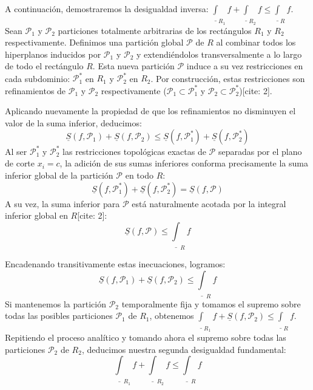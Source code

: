 \documentclass[11pt,letterpaper]{article}
\begin{document}
A continuación, demostraremos la desigualdad inversa: $\underline{\int}_{R_{1}}f + \underline{\int}_{R_{2}}f \le \underline{\int}_{R}f$.
Sean $\mathcal{P}_{1}$ y $\mathcal{P}_{2}$ particiones totalmente arbitrarias de los rectángulos $R_{1}$ y $R_{2}$ respectivamente. Definimos una partición global $\mathcal{P}$ de $R$ al combinar todos los hiperplanos inducidos por $\mathcal{P}_{1}$ y $\mathcal{P}_{2}$ y extendiéndolos transversalmente a lo largo de todo el rectángulo $R$. Esta nueva partición $\mathcal{P}$ induce a su vez restricciones en cada subdominio: $\mathcal{P}_{1}^{*}$ en $R_{1}$ y $\mathcal{P}_{2}^{*}$ en $R_{2}$. Por construcción, estas restricciones son refinamientos de $\mathcal{P}_{1}$ y $\mathcal{P}_{2}$ respectivamente ($\mathcal{P}_{1} \subset \mathcal{P}_{1}^{*}$ y $\mathcal{P}_{2} \subset \mathcal{P}_{2}^{*}$)[cite: 2].

Aplicando nuevamente la propiedad de que los refinamientos no disminuyen el valor de la suma inferior, deducimos:
\begin{equation*}
\underline{S}(f, \mathcal{P}_{1}) + \underline{S}(f, \mathcal{P}_{2}) \le \underline{S}(f, \mathcal{P}_{1}^{*}) + \underline{S}(f, \mathcal{P}_{2}^{*})
\end{equation*}
Al ser $\mathcal{P}_{1}^{*}$ y $\mathcal{P}_{2}^{*}$ las restricciones topológicas exactas de $\mathcal{P}$ separadas por el plano de corte $x_{i}=c$, la adición de sus sumas inferiores conforma precisamente la suma inferior global de la partición $\mathcal{P}$ en todo $R$:
\begin{equation*}
\underline{S}(f, \mathcal{P}_{1}^{*}) + \underline{S}(f, \mathcal{P}_{2}^{*}) = \underline{S}(f, \mathcal{P})
\end{equation*}
A su vez, la suma inferior para $\mathcal{P}$ está naturalmente acotada por la integral inferior global en $R$[cite: 2]:
\begin{equation*}
\underline{S}(f, \mathcal{P}) \le \underline{\int}_{R}f
\end{equation*}

Encadenando transitivamente estas inecuaciones, logramos:
\begin{equation*}
\underline{S}(f, \mathcal{P}_{1}) + \underline{S}(f, \mathcal{P}_{2}) \le \underline{\int}_{R}f
\end{equation*}
Si mantenemos la partición $\mathcal{P}_{2}$ temporalmente fija y tomamos el supremo sobre todas las posibles particiones $\mathcal{P}_{1}$ de $R_{1}$, obtenemos $\underline{\int}_{R_{1}}f + \underline{S}(f, \mathcal{P}_{2}) \le \underline{\int}_{R}f$. Repitiendo el proceso analítico y tomando ahora el supremo sobre todas las particiones $\mathcal{P}_{2}$ de $R_{2}$, deducimos nuestra segunda desigualdad fundamental:
\begin{equation*}
\underline{\int}_{R_{1}}f + \underline{\int}_{R_{2}}f \le \underline{\int}_{R}f
\end{equation*}
\end{document}
